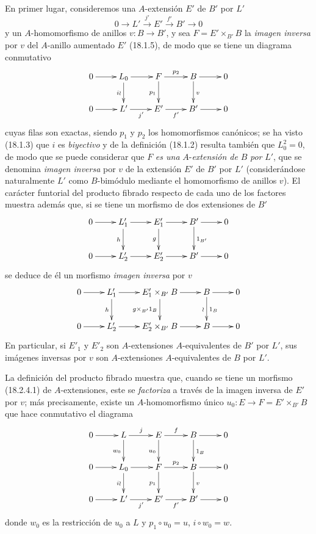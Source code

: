 \begin{env}[18.2.5]
\label{0.18.2.5-fr}
En primer lugar, consideremos una $A$-extensión $E'$ de $B'$ por $L'$
\[
  0\longrightarrow L'\xrightarrow{j'}E'\xrightarrow{f'}B'\longrightarrow0
\]
y un $A$-homomorfismo de anillos $v:B\to B'$, y sea
$F=E'\times_{B'}B$ la \emph{imagen inversa} por $v$ del $A$-anillo aumentado
$E'$ (18.1.5), de modo que se tiene un diagrama conmutativo
\[
  \xymatrix{
    0\ar[r] & L_0\ar[r]\ar[d]_{i\wr} & F\ar[r]^{p_2}\ar[d]_{p_1}
      & B\ar[r]\ar[d]^v & 0\\
    0\ar[r] & L'\ar[r]_{j'} & E'\ar[r]_{f'} & B'\ar[r] & 0
  }
\]
cuyas filas son exactas, siendo $p_1$ y $p_2$ los homomorfismos
canónicos; se ha visto (18.1.3) que $i$ es \emph{biyectivo} y de la
definición (18.1.2) resulta también que $L_0^2=0$, de modo que se puede considerar que $F$
\emph{es una} $A$-\emph{extensión de} $B$ \emph{por} $L'$, que se denomina \emph{imagen
inversa} por $v$ de la extensión $E'$ de $B'$ por $L'$ (considerándose
naturalmente $L'$ como $B$-bimódulo mediante el homomorfismo
de anillos $v$). El carácter funtorial
del producto fibrado respecto de cada uno de los factores muestra además que, si se
tiene un morfismo de dos extensiones de $B'$
\[
  \xymatrix{
    0\ar[r] & L'_1\ar[r]\ar[d]_h & E'_1\ar[r]\ar[d]_g
      & B'\ar[r]\ar[d]^{1_{B'}} & 0\\
    0\ar[r] & L'_2\ar[r] & E'_2\ar[r] & B'\ar[r] & 0
  }
\]
se deduce de él un morfismo \emph{imagen inversa} por $v$
\[
  \xymatrix{
    0\ar[r] & L'_1\ar[r]\ar[d]_h & E'_1\times_{B'}B\ar[r]
      \ar[d]_{g\times_{B'}1_B} & B\ar[r]\ar[d]^{1_B}_{\wr} & 0\\
    0\ar[r] & L'_2\ar[r] & E'_2\times_{B'}B\ar[r] & B\ar[r] & 0
  }
\]
En particular, si $E'_1$ y $E'_2$ son $A$-extensiones
$A$-equivalentes de $B'$ por $L'$, sus imágenes inversas por $v$ son
$A$-extensiones $A$-equivalentes de $B$ por $L'$.

La definición del producto fibrado muestra que, cuando se tiene un morfismo
(18.2.4.1) de $A$-extensiones, este se \emph{factoriza} a través de la imagen
inversa de $E'$ por $v$; más precisamente, existe un
$A$-homomorfismo único $u_0:E\to F=E'\times_{B'}B$ que hace conmutativo el
diagrama
\[
  \xymatrix{
    0\ar[r] & L\ar[r]^j\ar[d]_{w_0} & E\ar[r]^f\ar[d]_{u_0}
      & B\ar[r]\ar[d]^{1_B} & 0\\
    0\ar[r] & L_0\ar[r]\ar[d]_{i\wr} & F\ar[r]^{p_2}\ar[d]_{p_1}
      & B\ar[r]\ar[d]^v & 0\\
    0\ar[r] & L'\ar[r]_{j'} & E'\ar[r]_{f'} & B'\ar[r] & 0
  }
\]
donde $w_0$ es la restricción de $u_0$ a $L$ y
$p_1\circ u_0=u$, $i\circ w_0=w$.
\end{env}

